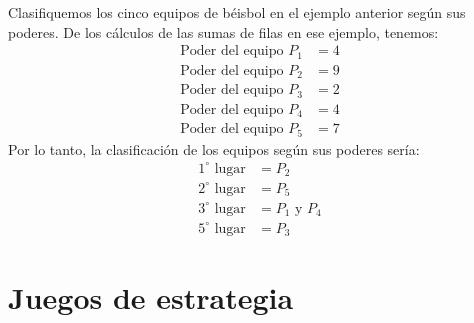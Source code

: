 \begin{examplebox}{}{}
    Clasifiquemos los cinco equipos de béisbol en el ejemplo anterior según sus poderes. De los cálculos de las sumas de filas en ese ejemplo, tenemos:
    \begin{align*}
        \text{Poder del equipo $P_1$} & = 4 \\
        \text{Poder del equipo $P_2$} & = 9 \\
        \text{Poder del equipo $P_3$} & = 2 \\
        \text{Poder del equipo $P_4$} & = 4 \\
        \text{Poder del equipo $P_5$} & = 7
    \end{align*}
    Por lo tanto, la clasificación de los equipos según sus poderes sería:
    \begin{align*}
        \text{$1^{\circ}$ lugar} & = P_2 \\
        \text{$2^{\circ}$ lugar} & = P_5 \\
        \text{$3^{\circ}$ lugar} & = P_1 \text{ y } P_4 \\
        \text{$5^{\circ}$ lugar} & = P_3
    \end{align*}
\end{examplebox}

\section{Juegos de estrategia}

